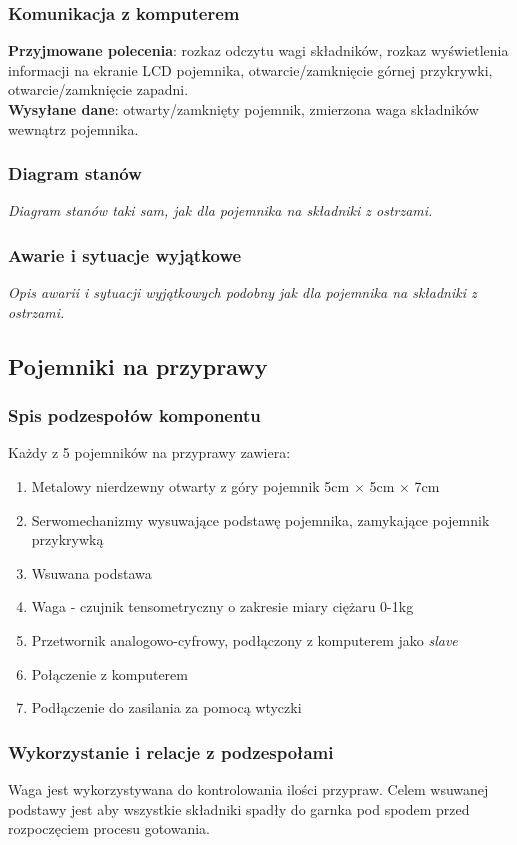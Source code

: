 \documentclass[12pt,a4paper,notitlepage]{article}
\begin{document}
\subsubsection{Komunikacja z komputerem}
\textbf{Przyjmowane polecenia}: rozkaz odczytu wagi składników, rozkaz wyświetlenia informacji na ekranie LCD pojemnika, otwarcie/zamknięcie górnej przykrywki, otwarcie/zamknięcie zapadni.\\
\textbf{Wysyłane dane}: otwarty/zamknięty pojemnik, zmierzona waga składników wewnątrz pojemnika.

\subsubsection{Diagram stanów}
\emph{Diagram stanów taki sam, jak dla pojemnika na składniki z ostrzami.}

\subsubsection{Awarie i sytuacje wyjątkowe}
\emph{Opis awarii i sytuacji wyjątkowych podobny jak dla pojemnika na składniki z ostrzami.}



\subsection{Pojemniki na przyprawy}
\subsubsection{Spis podzespołów komponentu}
Każdy z 5 pojemników na przyprawy zawiera:
\begin{enumerate}
  \item Metalowy nierdzewny otwarty z góry pojemnik 5cm $\times$ 5cm $\times$ 7cm
  \item Serwomechanizmy wysuwające podstawę pojemnika, zamykające pojemnik przykrywką
  \item Wsuwana podstawa
  \item Waga - czujnik tensometryczny o zakresie miary ciężaru 0-1kg
  \item Przetwornik analogowo-cyfrowy, podłączony z komputerem jako \emph{slave}
  \item Połączenie z komputerem
  \item Podłączenie do zasilania za pomocą wtyczki
\end{enumerate}
 
\subsubsection{Wykorzystanie i relacje z podzespołami}
Waga jest wykorzystywana do kontrolowania ilości przypraw. Celem wsuwanej podstawy jest aby wszystkie składniki spadły do garnka pod spodem przed rozpoczęciem procesu gotowania.
\end{document}
